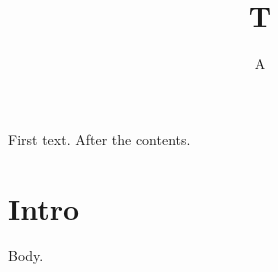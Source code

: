 \documentclass{article}
\begin{document}
\title{T}\author{A}\maketitle
\abstract
First text.
\tableofcontents
After the contents.
\section{Intro}
Body.
\end{document}
